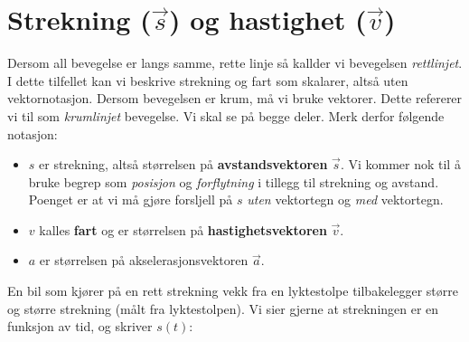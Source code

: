 \section{Strekning ($\vec{s}$) og hastighet ($\vec{v}$)}
Dersom all bevegelse er langs samme, rette linje så kallder vi bevegelsen \textit{rettlinjet}. I dette tilfellet kan vi beskrive strekning og fart som skalarer, altså uten vektornotasjon. Dersom bevegelsen er krum, må vi bruke vektorer. Dette refererer vi til som \textit{krumlinjet} bevegelse. Vi skal se på begge deler. Merk derfor følgende notasjon:
\begin{itemize}
    \item $s$ er strekning, altså størrelsen på \textbf{avstandsvektoren} $\vec{s}$. Vi kommer nok til å bruke begrep som \textit{posisjon} og \textit{forflytning} i tillegg til strekning og avstand. Poenget er at vi må gjøre forsljell på $s$ \textit{uten} vektortegn og \textit{med} vektortegn.
    \item $v$ kalles \textbf{fart} og er størrelsen på \textbf{hastighetsvektoren} $\vec{v}$.
    \item $a$ er størrelsen på akselerasjonsvektoren $\vec{a}$.
\end{itemize}

En bil som kjører på en rett strekning vekk fra en lyktestolpe tilbakelegger større og større strekning (målt fra lyktestolpen). Vi sier gjerne at strekningen er en funksjon av tid, og skriver $s(t)$:

